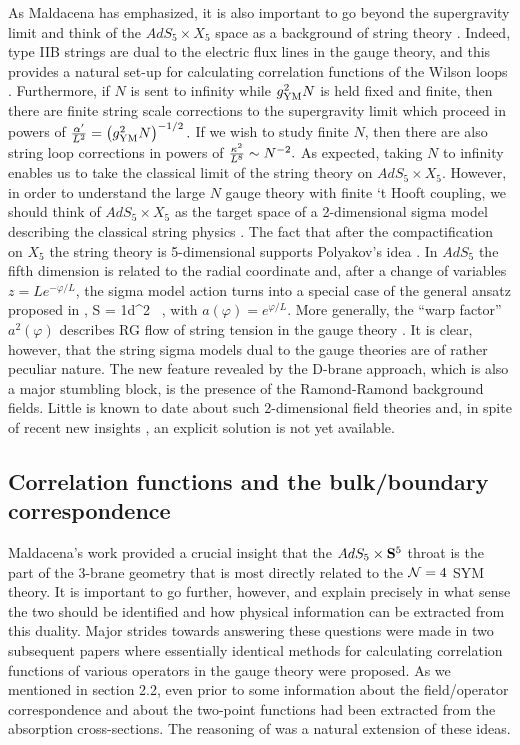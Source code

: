 \documentclass[12pt]{article}
\begin{document}
As Maldacena has emphasized, it is also important to go beyond
the supergravity limit and think of the $AdS_5\times X_5$ space
as a background of string theory \cite{jthroat}. Indeed, type IIB strings
are dual to the electric flux lines in the gauge theory, and
this provides a natural set-up for calculating correlation 
functions of the Wilson loops \cite{Malda}. 
Furthermore, if $N$ is sent to infinity
while $g_{\rm YM}^2 N$ is held fixed and finite, then there are finite
string scale corrections to the supergravity limit \cite{jthroat,US,EW}
which proceed in powers of
${\alpha'\over L^2} = \left (g_{\rm YM}^2 N \right)^{-1/2}
.
$
If we wish to study finite $N$, then there are also string loop
corrections in powers of
$ {\kappa^2\over L^8} \sim N^{-2}
.
$
As expected, taking $N$ to infinity enables us to take
the classical limit of the string theory on $AdS_5\times X_5$.
However, in order to understand the large $N$
gauge theory with finite `t Hooft coupling,
we should think of $AdS_5\times X_5$ as the target space of a 
2-dimensional sigma model describing the classical string physics 
\cite{US}. The fact that after the compactification on $X_5$ 
the string theory is 5-dimensional supports Polyakov's idea \cite{Sasha}.
In $AdS_5$ the fifth dimension is related to
the radial coordinate and, after a change of variables
$z= L e^{-\varphi/L}$, the sigma model action turns into a special
case of the general ansatz proposed in \cite{Sasha},
\be
S = {1}\int d^2 
\ ,
\ee
with $a(\varphi) = e^{\varphi/L}$. More generally, the ``warp factor''
$a^2(\varphi)$ describes RG flow of string tension in the
gauge theory \cite{Sasha}.
It is clear, however, that the string sigma models dual to the gauge
theories are of rather peculiar nature. The new feature revealed
by the D-brane approach, which is also a major stumbling block,
is the presence of the Ramond-Ramond background fields. Little is known
to date about such 2-dimensional field theories and, in spite of
recent new insights \cite{MT,BVW,Berk}, 
an explicit solution is not yet available.

\subsection{Correlation functions and the bulk/boundary correspondence}

Maldacena's work provided a crucial insight that the $AdS_5\times {\bf S}^5$ 
throat is the part of the 3-brane geometry that is most directly related
to the ${\cal N}=4$ SYM theory. It is important to go further, however,
and explain precisely in 
what sense the two should be identified and how physical information
can be extracted from this duality. Major strides towards
answering these questions were made in two subsequent papers 
\cite{US,EW} where
essentially identical methods for calculating correlation functions
of various operators in the gauge theory were proposed.
As we mentioned in section 2.2, even prior to \cite{jthroat} some
information about the field/operator correspondence
and about the two-point functions had been extracted from
the absorption cross-sections. The reasoning of \cite{US}
was a natural extension of these ideas. 
\end{document}
